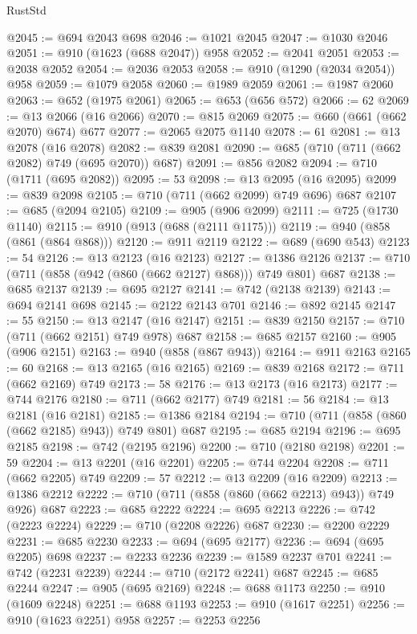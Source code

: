 \begin{lexlean}{RustStd}
\begin{coremodule}
@2045 := @694 @2043 @698
@2046 := @1021 @2045
@2047 := @1030 @2046
@2051 := @910 (@1623 (@688 @2047)) @958
@2052 := @2041 @2051
@2053 := @2038 @2052
@2054 := @2036 @2053
@2058 := @910 (@1290 (@2034 @2054)) @958
@2059 := @1079 @2058
@2060 := @1989 @2059
@2061 := @1987 @2060
@2063 := @652 (@1975 @2061)
@2065 := @653 (@656 @572)
@2066 := 62
@2069 := @13 @2066 (@16 @2066)
@2070 := @815 @2069
@2075 := @660 (@661 (@662 @2070) @674) @677
@2077 := @2065 @2075 @1140
@2078 := 61
@2081 := @13 @2078 (@16 @2078)
@2082 := @839 @2081
@2090 := @685 (@710 (@711 (@662 @2082) @749 (@695 @2070)) @687)
@2091 := @856 @2082
@2094 := @710 (@1711 (@695 @2082))
@2095 := 53
@2098 := @13 @2095 (@16 @2095)
@2099 := @839 @2098
@2105 := @710 (@711 (@662 @2099) @749 @696) @687
@2107 := @685 (@2094 @2105)
@2109 := @905 (@906 @2099)
@2111 := @725 (@1730 @1140)
@2115 := @910 (@913 (@688 (@2111 @1175)))
@2119 := @940 (@858 (@861 (@864 @868)))
@2120 := @911 @2119
@2122 := @689 (@690 @543)
@2123 := 54
@2126 := @13 @2123 (@16 @2123)
@2127 := @1386 @2126
@2137 := @710 (@711 (@858 (@942 (@860 (@662 @2127) @868))) @749 @801) @687
@2138 := @685 @2137
@2139 := @695 @2127
@2141 := @742 (@2138 @2139)
@2143 := @694 @2141 @698
@2145 := @2122 @2143 @701
@2146 := @892 @2145
@2147 := 55
@2150 := @13 @2147 (@16 @2147)
@2151 := @839 @2150
@2157 := @710 (@711 (@662 @2151) @749 @978) @687
@2158 := @685 @2157
@2160 := @905 (@906 @2151)
@2163 := @940 (@858 (@867 @943))
@2164 := @911 @2163
@2165 := 60
@2168 := @13 @2165 (@16 @2165)
@2169 := @839 @2168
@2172 := @711 (@662 @2169) @749
@2173 := 58
@2176 := @13 @2173 (@16 @2173)
@2177 := @744 @2176
@2180 := @711 (@662 @2177) @749
@2181 := 56
@2184 := @13 @2181 (@16 @2181)
@2185 := @1386 @2184
@2194 := @710 (@711 (@858 (@860 (@662 @2185) @943)) @749 @801) @687
@2195 := @685 @2194
@2196 := @695 @2185
@2198 := @742 (@2195 @2196)
@2200 := @710 (@2180 @2198)
@2201 := 59
@2204 := @13 @2201 (@16 @2201)
@2205 := @744 @2204
@2208 := @711 (@662 @2205) @749
@2209 := 57
@2212 := @13 @2209 (@16 @2209)
@2213 := @1386 @2212
@2222 := @710 (@711 (@858 (@860 (@662 @2213) @943)) @749 @926) @687
@2223 := @685 @2222
@2224 := @695 @2213
@2226 := @742 (@2223 @2224)
@2229 := @710 (@2208 @2226) @687
@2230 := @2200 @2229
@2231 := @685 @2230
@2233 := @694 (@695 @2177)
@2236 := @694 (@695 @2205) @698
@2237 := @2233 @2236
@2239 := @1589 @2237 @701
@2241 := @742 (@2231 @2239)
@2244 := @710 (@2172 @2241) @687
@2245 := @685 @2244
@2247 := @905 (@695 @2169)
@2248 := @688 @1173
@2250 := @910 (@1609 @2248)
@2251 := @688 @1193
@2253 := @910 (@1617 @2251)
@2256 := @910 (@1623 @2251) @958
@2257 := @2253 @2256

\end{coremodule}
\end{lexlean}
